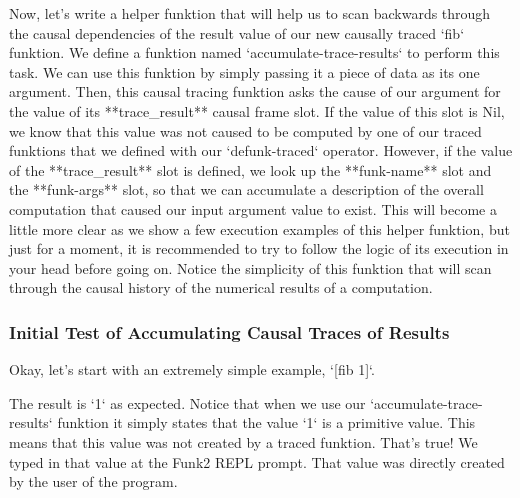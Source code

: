 Now, let's write a helper funktion that will help us to scan backwards
through the causal dependencies of the result value of our new
causally traced `fib` funktion.  We define a funktion named
`accumulate-trace-results` to perform this task.  We can use this
funktion by simply passing it a piece of data as its one argument.
Then, this causal tracing funktion asks the cause of our argument for
the value of its **trace\_result** causal frame slot.  If the value of
this slot is Nil, we know that this value was not caused to be
computed by one of our traced funktions that we defined with our
`defunk-traced` operator.  However, if the value of the
**trace\_result** slot is defined, we look up the **funk-name** slot
and the **funk-args** slot, so that we can accumulate a description of
the overall computation that caused our input argument value to exist.
This will become a little more clear as we show a few execution
examples of this helper funktion, but just for a moment, it is
recommended to try to follow the logic of its execution in your head
before going on.  Notice the simplicity of this funktion that will
scan through the causal history of the numerical results of a
computation.

%

\subsubsection{Initial Test of Accumulating Causal Traces of Results}

Okay, let's start with an extremely simple example, `[fib 1]`.

%
%
%
%
%
%

The result is `1` as expected.  Notice that when we use our
`accumulate-trace-results` funktion it simply states that the value
`1` is a primitive value.  This means that this value was not created
by a traced funktion.  That's true!  We typed in that value at the
Funk2 REPL prompt.  That value was directly created by the user of the
program.

